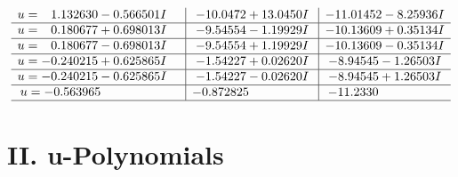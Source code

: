 \documentclass[1p]{elsarticle_modified}
\theoremstyle{definition}
\begin{document}
$$\begin{array}{c|c|c}
\begin{aligned}
u &= \phantom{-}1.132630 - 0.566501 I\end{aligned}
 & -10.0472 + 13.0450 I & -11.01452 - 8.25936 I \\ \hline\begin{aligned}
u &= \phantom{-}0.180677 + 0.698013 I\end{aligned}
 & -9.54554 - 1.19929 I & -10.13609 + 0.35134 I \\ \hline\begin{aligned}
u &= \phantom{-}0.180677 - 0.698013 I\end{aligned}
 & -9.54554 + 1.19929 I & -10.13609 - 0.35134 I \\ \hline\begin{aligned}
u &= -0.240215 + 0.625865 I\end{aligned}
 & -1.54227 + 0.02620 I & -8.94545 - 1.26503 I \\ \hline\begin{aligned}
u &= -0.240215 - 0.625865 I\end{aligned}
 & -1.54227 - 0.02620 I & -8.94545 + 1.26503 I \\ \hline\begin{aligned}
u &= -0.563965\phantom{ +0.000000I}\end{aligned}
 & -0.872825\phantom{ +0.000000I} & -11.2330\phantom{ +0.000000I}\\
 \hline 
 \end{array}$$\newpage
\newpage\renewcommand{\arraystretch}{1}
\centering \section*{ II. u-Polynomials}
\end{document}
